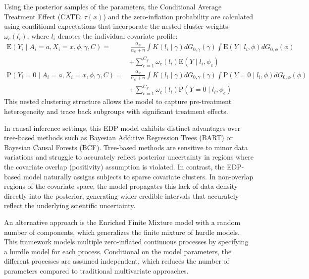 \documentclass[11pt, a4paper]{article}
\begin{document}
Using the posterior samples of the parameters, the Conditional Average Treatment Effect (CATE; $\tau(x)$) and the zero-inflation probability are calculated using conditional expectations that incorporate the nested cluster weights $\omega_c(l_i)$, where $l_i$ denotes the individual covariate profile:
\begin{align}
\text{E}(Y_i \mid A_i = a, X_i = x, \phi, \gamma, C) = & \, \frac{\alpha_\phi}{\alpha_\phi + n} \int K(l_i \mid \gamma) dG_{0, \gamma}(\gamma) \int \text{E}(Y \mid l_i, \phi) dG_{0, \phi}(\phi) \nonumber \\
& + \sum_{c=1}^{C_y} \omega_c(l_i) \text{E}(Y \mid l_i, \phi_c) \\[10pt]
\text{P}(Y_i = 0 \mid A_i = a, X_i = x, \phi, \gamma, C) = & \, \frac{\alpha_\phi}{\alpha_\phi + n} \int K(l_i \mid \gamma) dG_{0, \gamma}(\gamma) \int \text{P}(Y = 0 \mid l_i, \phi) dG_{0, \phi}(\phi) \nonumber \\
& + \sum_{c=1}^{C_y} \omega_c(l_i) \text{P}(Y = 0 \mid l_i, \phi_c)
\end{align}
This nested clustering structure allows the model to capture pre-treatment heterogeneity and trace back subgroups with significant treatment effects.\cite{oganisian2021, wade2011} 

In causal inference settings, this EDP model exhibits distinct advantages over tree-based methods such as Bayesian Additive Regression Trees (BART) or Bayesian Causal Forests (BCF).\cite{oganisian2021, wade2011} Tree-based methods are sensitive to minor data variations and struggle to accurately reflect posterior uncertainty in regions where the covariate overlap (positivity) assumption is violated.\cite{oganisian2021, wade2011} In contrast, the EDP-based model naturally assigns subjects to sparse covariate clusters.\cite{wade2011} In non-overlap regions of the covariate space, the model propagates this lack of data density directly into the posterior, generating wider credible intervals that accurately reflect the underlying scientific uncertainty.\cite{oganisian2021, wade2011}

An alternative approach is the Enriched Finite Mixture model with a random number of components, which generalizes the finite mixture of hurdle models.\cite{dellaportas2006, richardson1997, papageorgiou2011, green1995} This framework models multiple zero-inflated continuous processes by specifying a hurdle model for each process.\cite{dellaportas2006, papageorgiou2011, green1995} Conditional on the model parameters, the different processes are assumed independent, which reduces the number of parameters compared to traditional multivariate approaches.\cite{dellaportas2006, papageorgiou2011} 
\end{document}
